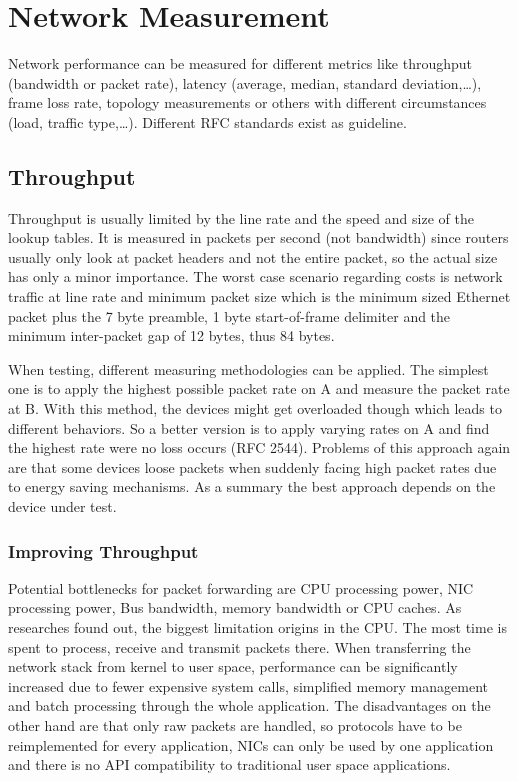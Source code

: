 
\section{Network Measurement}
Network performance can be measured for different metrics like throughput (bandwidth or packet rate), latency (average, median, standard deviation,\dots), frame loss rate, topology measurements or others with different circumstances (load, traffic type,\dots).
Different RFC standards exist as guideline.

\subsection{Throughput}
Throughput is usually limited by the line rate and the speed and size of the lookup tables.
It is measured in packets per second (not bandwidth) since routers usually only look at packet headers and not the entire packet, so the actual size has only a minor importance.
The worst case scenario regarding costs is network traffic at line rate and minimum packet size which is the minimum sized Ethernet packet plus the 7 byte preamble, 1 byte start-of-frame delimiter and the minimum inter-packet gap of 12 bytes, thus 84 bytes.\\
\vspace{4pt}

When testing, different measuring methodologies can be applied.
The simplest one is to apply the highest possible packet rate on A and measure the packet rate at B.
With this method, the devices might get overloaded though which leads to different behaviors.
So a better version is to apply varying rates on A and find the highest rate were no loss occurs (RFC 2544).
Problems of this approach again are that some devices loose packets when suddenly facing high packet rates due to energy saving mechanisms.
As a summary the best approach depends on the device under test.

\subsubsection*{Improving Throughput}
Potential bottlenecks for packet forwarding are CPU processing power, NIC processing power, Bus bandwidth, memory bandwidth or CPU caches.
As researches found out, the biggest limitation origins in the CPU.
The most time is spent to process, receive and transmit packets there.
When transferring the network stack from kernel to user space, performance can be significantly increased due to fewer expensive system calls, simplified memory management and batch processing through the whole application.
The disadvantages on the other hand are that only raw packets are handled, so protocols have to be reimplemented for every application, NICs can only be used by one application and there is no API compatibility to traditional user space applications.

